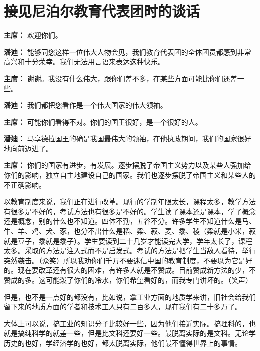 \section[接见尼泊尔教育代表团时的谈话（一九六四年八月二十九日）]{接见尼泊尔教育代表团时的谈话}

\begin{duihua}

\item[\textbf{主席：}] 欢迎你们。

\item[\textbf{潘迪：}] 能够同您这样一位伟大人物会见，我们教育代表团的全体团员都感到非常高兴和十分荣幸。我们无法用言语来表达这种快乐。

\item[\textbf{主席：}] 谢谢。我没有什么伟大，跟你们差不多，在某些方面可能比你们还差一些。

\item[\textbf{潘迪：}] 我们都把您看作是一个伟大国家的伟大领袖。

\item[\textbf{主席：}] 可能你们看得不对。你们的国王很好，是一个很好的人。

\item[\textbf{潘廸：}] 马享德拉国王的确是我国最伟大的领袖，在他执政期间，我们的国家很好地向前迈进了。

\item[\textbf{主席：}] 你们的国家有进步，有发展。逐步摆脱了帝国主义势力以及某些人强加给你们的影响，独立自主地建设自己的国家。我们也逐步摆脱了帝国主义和某些人的不正确影响。

以教育制度来说，我们正在进行改革。现行的学制年限太长，课程太多，教学方法有很多是不好的，考试方法也有很多是不好的。学生读了课本还是课本，学了概念还是概念，别的什么也不知道。四体不勤，五谷不分。许多学生不知道什么是马、牛、羊、鸡、犬、豕，也分不出什么是稻、粱、菽、麦、黍、稷（粱就是小米，菽就是豆子，黍就是黍子）。学生要读到二十几岁才能读完大学，学年太长了，课程太多。采取的方法是注入式而不是启发式。考试的方法是把学生当敌人看待，举行突然袭击。（众笑）所以我劝你们千万不要迷信中国的教育制度，不要以为它是好的。现在要改革还有很大的困难，有许多人就是不赞成。目前赞成新方法的少，不赞成的多。这可能泼了你们的冷水，你们希望看好的，而我专门讲坏的。（笑声）

但是，也不是一点好的都没有，比如说，拿工业方面的地质学来讲，旧社会给我们留下来的地质方面的学者和技术工人只有二百多人，现在我们有二十多万了。

大体上可以说，搞工业的知识分子比较好一些，因为他们接近实际。搞理科的，也就是搞纯科学的就差一些，但是比文科还要好一些。最脱离实际的是文科。无论学历史的也好，学经济学的也好，都太脱离实际，他们最不懂得世界上的事情。


\end{duihua}
